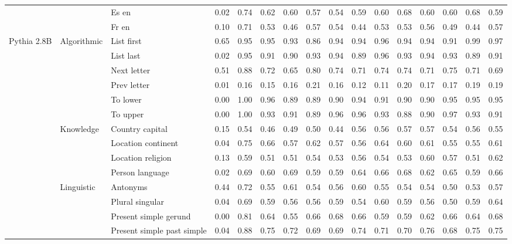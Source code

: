 \begin{center}
\begin{longtable}{lllrrrrrrrrrrrrr}
 &  & Es en & 0.02 & 0.74 & 0.62 & 0.60 & 0.57 & 0.54 & 0.59 & 0.60 & 0.68 & 0.60 & 0.60 & 0.68 & 0.59 \\
 &  & Fr en & 0.10 & 0.71 & 0.53 & 0.46 & 0.57 & 0.54 & 0.44 & 0.53 & 0.53 & 0.56 & 0.49 & 0.44 & 0.57 \\
\cline{1-16} \cline{2-16}
\multirow[t]{18}{*}{Pythia 2.8B} & \multirow[t]{6}{*}{Algorithmic} & List first & 0.65 & 0.95 & 0.95 & 0.93 & 0.86 & 0.94 & 0.94 & 0.96 & 0.94 & 0.94 & 0.91 & 0.99 & 0.97 \\
 &  & List last & 0.02 & 0.95 & 0.91 & 0.90 & 0.93 & 0.94 & 0.89 & 0.96 & 0.93 & 0.94 & 0.93 & 0.89 & 0.91 \\
 &  & Next letter & 0.51 & 0.88 & 0.72 & 0.65 & 0.80 & 0.74 & 0.71 & 0.74 & 0.74 & 0.71 & 0.75 & 0.71 & 0.69 \\
 &  & Prev letter & 0.01 & 0.16 & 0.15 & 0.16 & 0.21 & 0.16 & 0.12 & 0.11 & 0.20 & 0.17 & 0.17 & 0.19 & 0.19 \\
 &  & To lower & 0.00 & 1.00 & 0.96 & 0.89 & 0.89 & 0.90 & 0.94 & 0.91 & 0.90 & 0.90 & 0.95 & 0.95 & 0.95 \\
 &  & To upper & 0.00 & 1.00 & 0.93 & 0.91 & 0.89 & 0.96 & 0.96 & 0.93 & 0.88 & 0.90 & 0.97 & 0.93 & 0.91 \\
\cline{2-16}
 & \multirow[t]{4}{*}{Knowledge} & Country capital & 0.15 & 0.54 & 0.46 & 0.49 & 0.50 & 0.44 & 0.56 & 0.56 & 0.57 & 0.57 & 0.54 & 0.56 & 0.55 \\
 &  & Location continent & 0.04 & 0.75 & 0.66 & 0.57 & 0.62 & 0.57 & 0.56 & 0.64 & 0.60 & 0.61 & 0.55 & 0.55 & 0.61 \\
 &  & Location religion & 0.13 & 0.59 & 0.51 & 0.51 & 0.54 & 0.53 & 0.56 & 0.54 & 0.53 & 0.60 & 0.57 & 0.51 & 0.62 \\
 &  & Person language & 0.02 & 0.69 & 0.60 & 0.69 & 0.59 & 0.59 & 0.64 & 0.66 & 0.68 & 0.62 & 0.65 & 0.59 & 0.66 \\
\cline{2-16}
 & \multirow[t]{4}{*}{Linguistic} & Antonyms & 0.44 & 0.72 & 0.55 & 0.61 & 0.54 & 0.56 & 0.60 & 0.55 & 0.54 & 0.54 & 0.50 & 0.53 & 0.57 \\
 &  & Plural singular & 0.04 & 0.69 & 0.59 & 0.56 & 0.56 & 0.59 & 0.54 & 0.60 & 0.59 & 0.56 & 0.50 & 0.59 & 0.64 \\
 &  & Present simple gerund & 0.00 & 0.81 & 0.64 & 0.55 & 0.66 & 0.68 & 0.66 & 0.59 & 0.59 & 0.62 & 0.66 & 0.64 & 0.68 \\
 &  & Present simple past simple & 0.04 & 0.88 & 0.75 & 0.72 & 0.69 & 0.69 & 0.74 & 0.71 & 0.70 & 0.76 & 0.68 & 0.75 & 0.75 \\

\end{longtable}
\end{center}
